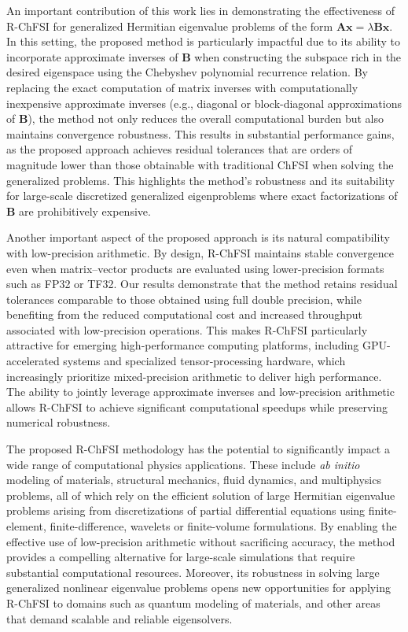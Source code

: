 \documentclass[preprint,3p,number,sort&compress]{elsarticle}
\newcommand{\bx}{\textbf{x}}
\newcommand{\bA}{\textbf{A}}
\newcommand{\bB}{\textbf{B}}
\begin{document}
An important contribution of this work lies in demonstrating the effectiveness of R-ChFSI for generalized Hermitian eigenvalue problems of the form $\bA \bx = \lambda \bB \bx$. In this setting, the proposed method is particularly impactful due to its ability to incorporate approximate inverses of $\bB$ when constructing the subspace rich in the desired eigenspace using the Chebyshev polynomial recurrence relation. By replacing the exact computation of matrix inverses with computationally inexpensive approximate inverses (e.g., diagonal or block-diagonal approximations of $\bB$), the method not only reduces the overall computational burden but also maintains convergence robustness. This results in substantial performance gains, as the proposed approach achieves residual tolerances that are orders of magnitude lower than those obtainable with traditional ChFSI when solving the generalized problems. This highlights the method’s robustness and its suitability for large-scale discretized generalized eigenproblems where exact factorizations of \(\bB\) are prohibitively expensive.

Another important aspect of the proposed approach is its natural compatibility with low-precision arithmetic. By design, R-ChFSI maintains stable convergence even when matrix–vector products are evaluated using lower-precision formats such as FP32 or TF32. Our results demonstrate that the method retains residual tolerances comparable to those obtained using full double precision, while benefiting from the reduced computational cost and increased throughput associated with low-precision operations. This makes R-ChFSI particularly attractive for emerging high-performance computing platforms, including GPU-accelerated systems and specialized tensor-processing hardware, which increasingly prioritize mixed-precision arithmetic to deliver high performance. The ability to jointly leverage approximate inverses and low-precision arithmetic allows R-ChFSI to achieve significant computational speedups while preserving numerical robustness.

The proposed R-ChFSI methodology has the potential to significantly impact a wide range of computational physics applications. These include \emph{ab initio} modeling of materials, structural mechanics, fluid dynamics, and multiphysics problems, all of which rely on the efficient solution of large Hermitian eigenvalue problems arising from discretizations of partial differential equations using finite-element, finite-difference, wavelets or finite-volume formulations. By enabling the effective use of low-precision arithmetic without sacrificing accuracy, the method provides a compelling alternative for large-scale simulations that require substantial computational resources. Moreover, its robustness in solving large generalized nonlinear eigenvalue problems opens new opportunities for applying R-ChFSI to domains such as quantum modeling of materials, and other areas that demand scalable and reliable eigensolvers.
\end{document}

